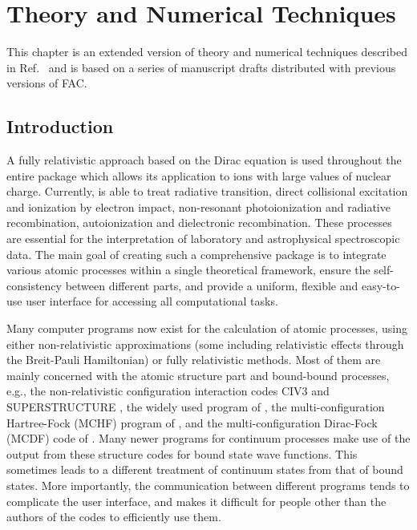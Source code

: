 \chapter{Theory and Numerical Techniques}
\label{ch:theory}

This chapter is an extended version of theory and numerical techniques described
in Ref.~\cite{gu:2008a} and is based on a series of manuscript drafts
distributed with previous versions of FAC.

\section{Introduction}

A fully relativistic approach based on
the Dirac equation is used throughout the entire package which allows its
application to ions with large values of nuclear charge. Currently, \cFAC
is able to treat radiative transition, direct collisional excitation and
ionization by electron impact, non-resonant photoionization and radiative
recombination, autoionization and dielectronic recombination. These processes
are essential for the interpretation of laboratory and astrophysical 
spectroscopic data. The main goal of creating such a comprehensive package is
to integrate various atomic processes within a single theoretical framework,
ensure the self-consistency between different parts, and provide a uniform,
flexible and easy-to-use user interface for accessing all computational tasks. 

Many computer programs now exist for the calculation of atomic processes,
using either non-relativistic approximations (some including relativistic
effects through the Breit-Pauli Hamiltonian) or fully relativistic
methods. Most of them are mainly concerned with the atomic structure part and
bound-bound processes, e.g., the non-relativistic configuration interaction
codes CIV3 \cite{hibbert75} and SUPERSTRUCTURE \cite{eissner74}, the widely
used program of \citet{cowan81}, the multi-configuration Hartree-Fock (MCHF)
program of \citet{fischer00}, and the multi-configuration Dirac-Fock (MCDF)
code of \citet{grant80}. Many newer programs for continuum processes make
use of the output from these structure codes for bound state wave
functions. This sometimes leads to 
a different treatment of continuum states from that of bound states. More
importantly, the communication between different programs tends to complicate
the user interface, and makes it difficult for people other than the authors
of the codes to efficiently use them. 

